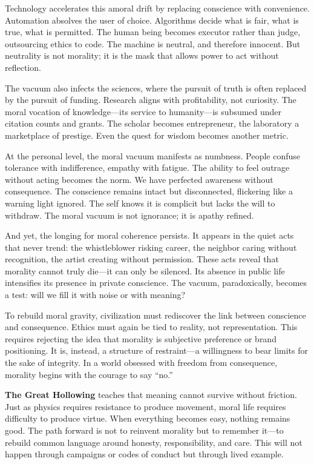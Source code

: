 \documentclass[11pt,twoside]{book}
\begin{document}
Technology accelerates this amoral drift by replacing conscience with convenience.  Automation absolves the user of choice.  Algorithms decide what is fair, what is true, what is permitted.  The human being becomes executor rather than judge, outsourcing ethics to code.  The machine is neutral, and therefore innocent.  But neutrality is not morality; it is the mask that allows power to act without reflection.

The vacuum also infects the sciences, where the pursuit of truth is often replaced by the pursuit of funding.  Research aligns with profitability, not curiosity.  The moral vocation of knowledge—its service to humanity—is subsumed under citation counts and grants.  The scholar becomes entrepreneur, the laboratory a marketplace of prestige.  Even the quest for wisdom becomes another metric.

At the personal level, the moral vacuum manifests as numbness.  People confuse tolerance with indifference, empathy with fatigue.  The ability to feel outrage without acting becomes the norm.  We have perfected awareness without consequence.  The conscience remains intact but disconnected, flickering like a warning light ignored.  The self knows it is complicit but lacks the will to withdraw.  The moral vacuum is not ignorance; it is apathy refined.

And yet, the longing for moral coherence persists.  It appears in the quiet acts that never trend: the whistleblower risking career, the neighbor caring without recognition, the artist creating without permission.  These acts reveal that morality cannot truly die—it can only be silenced.  Its absence in public life intensifies its presence in private conscience.  The vacuum, paradoxically, becomes a test: will we fill it with noise or with meaning?

To rebuild moral gravity, civilization must rediscover the link between conscience and consequence.  Ethics must again be tied to reality, not representation.  This requires rejecting the idea that morality is subjective preference or brand positioning.  It is, instead, a structure of restraint—a willingness to bear limits for the sake of integrity.  In a world obsessed with freedom from consequence, morality begins with the courage to say “no.”

\textbf{The Great Hollowing} teaches that meaning cannot survive without friction.  Just as physics requires resistance to produce movement, moral life requires difficulty to produce virtue.  When everything becomes easy, nothing remains good.  The path forward is not to reinvent morality but to remember it—to rebuild common language around honesty, responsibility, and care.  This will not happen through campaigns or codes of conduct but through lived example.
\end{document}
